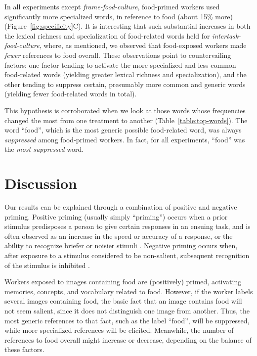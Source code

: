 \documentclass{sigchi}
\begin{document}
In all experiments except \textit{frame-food-culture}, food-primed workers 
used significantly more specialized words, in reference to food 
(about 15\% more) (Figure~\ref{fig:specificity}C).
It is interesting that such substantial increases in both the lexical 
richness and specialization of food-related words 
held for \textit{intertask-food-culture}, where, as mentioned, we observed 
that food-exposed workers made \textit{fewer} references to food overall. 
These observations point 
to countervailing factors: one factor tending to activate the more 
specialized and less common food-related words 
(yielding greater lexical richness and specialization), and the other tending 
to suppress certain, presumably more common and generic words 
(yielding fewer food-related words in total).

This hypothesis is corroborated when we look at those words whose 
frequencies changed the most from one treatment to another 
(Table~\ref{table:top-words}).  
The word ``food'', which is the most generic possible food-related word, was 
always \textit{suppressed} among food-primed workers.  In fact, 
for all experiments, ``food'' was the \textit{most suppressed} word.

\section{Discussion}
Our results can be 
explained through a combination of positive and negative priming.
Positive priming (usually simply ``priming'') occurs when a prior stimulus 
predisposes a person to give certain responses in an ensuing task, and
is often observed as an increase in the speed or accuracy of a response, or
the ability to recognize briefer or noisier stimuli 
\cite{BJOP1796,BJOP1826,Huber2008324}.
Negative priming occurs when, after exposure to a stimulus 
considered to be non-salient, subsequent recognition of the stimulus is 
inhibited \cite{mayr2007negative}.

Workers exposed to images containing food are (positively) primed, 
activating memories, concepts, and vocabulary related to food.  
However, if the worker labels several images containing food, the basic 
fact that an image contains food will not seem salient, since it 
does not distinguish one image from another.  Thus, the most 
generic references to that fact, such as the label ``food'', 
will be suppressed, while more specialized references will be elicited.  
Meanwhile, the number of references to food overall might increase or 
decrease, depending on the balance of these factors.  
\end{document}
